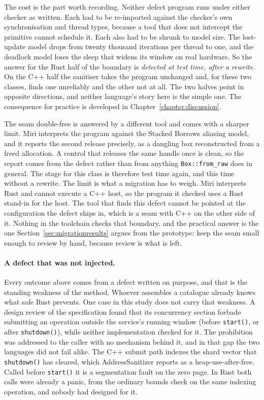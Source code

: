 \documentclass[english,oneside,a4paper,censored,csm,software-track-2020]{HYthesisML}
\begin{document}
The cost is the part worth recording. Neither defect program runs under either checker as
written. Each had to be re-imported against the checker's own synchronisation and thread types,
because a tool that does not intercept the primitive cannot schedule it. Each also had to be
shrunk to model size. The lost-update model drops from twenty thousand iterations per thread to
one, and the deadlock model loses the sleep that widens its window on real hardware. So the
answer for the Rust half of the boundary is \emph{detected at test time, after a rewrite}.
On the C++ half the sanitiser takes the program unchanged and, for these two classes,
finds one unreliably and the other not at all. The two halves point in opposite directions, and
neither language's story here is the simple one. The consequence for practice is developed in
Chapter~\ref{chapter:discussion}.

The seam double-free is answered by a different tool and comes with a sharper limit. Miri
interprets the program against the Stacked Borrows aliasing model, and it reports the second
release precisely, as a dangling box reconstructed from a freed allocation. A control that
releases the same handle once is clean, so the report comes from the defect rather than from
anything \texttt{Box::from\_raw} does in general. The stage for this class is therefore test
time again, and this time without a rewrite. The limit is what a migration has to weigh. Miri
interprets Rust and cannot execute a C++ host, so the program it checked uses a Rust stand-in
for the host. The tool that finds this defect cannot be pointed at the configuration the defect
ships in, which is a seam with C++ on the other side of it. Nothing in the toolchain checks
that boundary, and the practical answer is the one
Section~\ref{sec:migrationresults} argues from the prototype: keep the seam small enough to
review by hand, because review is what is left.

\paragraph{A defect that was not injected.}
Every outcome above comes from a defect written on purpose, and that is the standing weakness of
the method. Whoever assembles a catalogue already knows what safe Rust prevents. One case in
this study does not carry that weakness. A design review of the specification found that its
concurrency section forbade submitting an operation outside the service's running window
(before \texttt{start()}, or after \texttt{shutdown()}), while neither implementation checked
for it. The prohibition was addressed to the caller with no mechanism behind it, and in that gap
the two languages did not fail alike. The C++ submit path indexes the shard vector that
\texttt{shutdown()} has cleared, which AddressSanitizer reports as a heap-use-after-free. Called
before \texttt{start()} it is a segmentation fault on the zero page. In Rust both calls were
already a panic, from the ordinary bounds check on the same indexing operation, and nobody had
designed for it.
\end{document}
